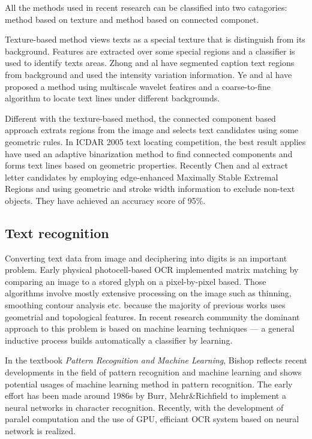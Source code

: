 \documentclass[paper=a4, french, 11pt]{scrartcl}
\begin{document}
All the methods used in recent research can be classified into two catagories: method based on texture and method based on connected componet.

Texture-based method views texts as a special texture that is distinguish from its background. Features are extracted over some special regions and a classifier is used to identify texts areas. Zhong and al have segmented caption text regions from background and used the intensity variation information. Ye and al have proposed a method using multiscale wavelet featires and a coarse-to-fine algorithm to locate text lines under different backgrounds.

Different with the texture-based method, the connected component based approach extrats regions from the image and selects text candidates using some geometric rules. In ICDAR 2005 text locating competition, the best result applies have used an adaptive binarization method to find connected components and forms text lines based on geometric properties. Recently Chen and al extract letter candidates by employing edge-enhanced Maximally Stable Extremal Regions and using geometric and stroke width information to exclude non-text objects. They have achieved an accuracy score of 95\%.

\subsection{Text recognition}
Converting text data from image and deciphering into digits is an important problem. Early physical photocell-based OCR implemented matrix matching by comparing an image to a stored glyph on a pixel-by-pixel based. Those algorithms involve mostly extensive processing on the image such as thinning, smoothing contour analysis etc. because the majority of previous works uses geometrial and topological features. In recent research community the dominant approach to this problem is based on machine learning techniques --- a general inductive process builds automatically a classifier by learning.

In the textbook \textit{Pattern Recognition and Machine Learning}, Bishop reflects recent developments in the field of pattern recognition and machine learning and shows potential usages of machine learning method in pattern recognition. The early effort has been made around 1986s by Burr, Mehr\&Richfield to implement a neural networks in character recognition. Recently, with the development of paralel computation and the use of GPU, efficiant OCR system based on neural network is realized. 
\end{document}
